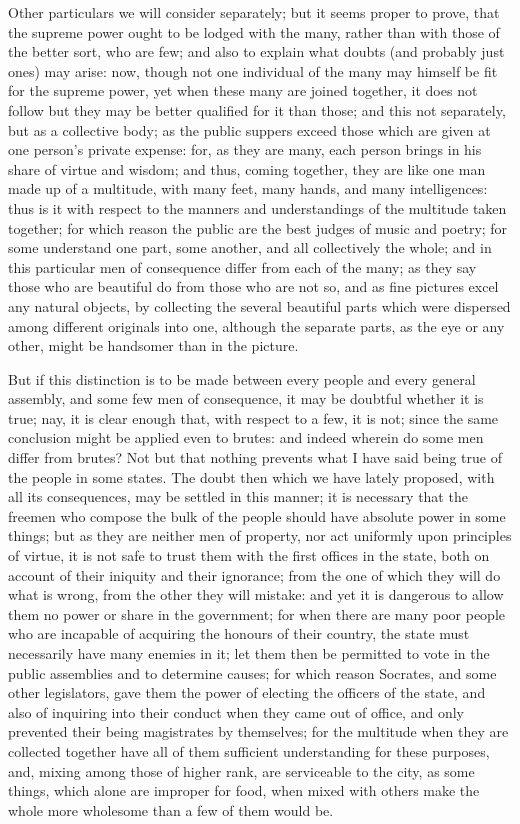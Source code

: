 Other particulars we will consider separately; but it seems proper to
prove, that the supreme power ought to be lodged with the many, rather
than with those of the better sort, who are few; and also to explain what
doubts (and probably just ones) may arise: now, though not one individual
of the many may himself be fit for the supreme power, yet when these many
are joined together, it does not follow but they may be better qualified
for it than those; and this not separately, but as a collective body; as
the public suppers exceed those which are given at one person's private
expense: for, as they are many, each person brings in his share of virtue
and wisdom; and thus, coming together, they are like one man made up of a
multitude, with many feet, many hands, and many intelligences: thus is it
with respect to the manners and understandings of the multitude taken
together; for which reason the public are the best judges of music and
poetry; for some understand one part, some another, and all collectively
the whole; and in this particular men of consequence differ from each of
the many; as they say those who are beautiful do from those who are not
so, and as fine pictures excel any natural objects, by collecting the
several beautiful parts which were dispersed among different originals
into one, although the separate parts, as the eye or any other, might be
handsomer than in the picture.

But if this distinction is to be made between every people and every
general assembly, and some few men of consequence, it may be doubtful
whether it is true; nay, it is clear enough that, with respect to a few,
it is not; since the same conclusion might be applied even to brutes: and
indeed wherein do some men differ from brutes? Not but that nothing
prevents what I have said being true of the people in some states. The
doubt then which we have lately proposed, with all its consequences, may
be settled in this manner; it is necessary that the freemen who compose
the bulk of the people should have absolute power in some things; but as
they are neither men of property, nor act uniformly upon principles of
virtue, it is not safe to trust them with the first offices in the state,
both on account of their iniquity and their ignorance; from the one of
which they will do what is wrong, from the other they will mistake: and
yet it is dangerous to allow them no power or share in the government; for
when there are many poor people who are incapable of acquiring the honours
of their country, the state must necessarily have many enemies in it; let
them then be permitted to vote in the public assemblies and to determine
causes; for which reason Socrates, and some other legislators, gave them
the power of electing the officers of the state, and also of inquiring
into their conduct when they came out of office, and only prevented their
being magistrates by themselves; for the multitude when they are collected
together have all of them sufficient understanding for these purposes,
and, mixing among those of higher rank, are serviceable to the city, as
some things, which alone are improper for food, when mixed with others
make the whole more wholesome than a few of them would be.

